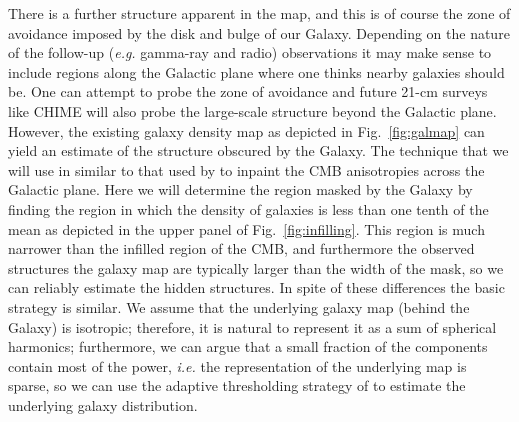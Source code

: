 \documentclass[useAMS,usenatbib]{mn2e}
\begin{document}
There is a further structure apparent in the map, and this is of
course the zone of avoidance imposed by the disk and bulge of our
Galaxy. Depending on the nature of the follow-up
({\em e.g.} gamma-ray and radio) observations it may make
sense to include regions along the Galactic plane where one thinks
nearby galaxies should be. One can attempt to probe the zone of avoidance
\citep[e.g][]{2000AJ....120..298J} and future 21-cm surveys like CHIME
\citep{2014era..conf10102V} will also probe the large-scale structure
beyond the Galactic plane.   However, the existing galaxy density map
as depicted in Fig.~\ref{fig:galmap} can yield an estimate of the
structure obscured by the Galaxy.  The technique that we will use in
similar to that used by \citet{2008StMet...5..289A} to inpaint the CMB
anisotropies across the Galactic plane.  Here we will determine the
region masked by the Galaxy by finding the region in which the density
of galaxies is less than one tenth of the mean as depicted in the
upper panel of Fig.~\ref{fig:infilling}.  This region is much narrower
than the infilled region of the CMB, and furthermore the observed
structures the galaxy map are typically larger than the width of the
mask, so we can reliably estimate the hidden structures.  In spite of
these differences the basic strategy is similar.  We assume that the
underlying galaxy map (behind the Galaxy) is isotropic; therefore, it
is natural to represent it as a sum of spherical harmonics;
furthermore, we can argue that a small fraction of the components
contain most of the power, {\em i.e.} the representation of the
underlying map is sparse, so we can use the adaptive thresholding
strategy of \citet{2007ITIP...16.2675B} to estimate the underlying
galaxy distribution.
\end{document}
